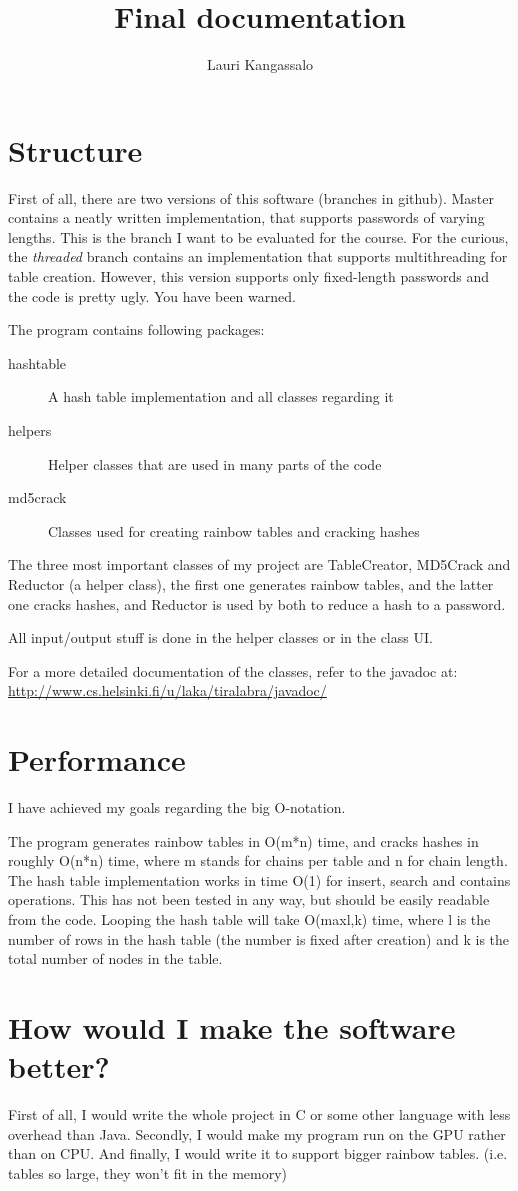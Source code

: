 \documentclass[a4paper, 11pt, finnish]{article}
\title{Final documentation}
\author{Lauri Kangassalo}
\begin{document}
  \maketitle
\section*{Structure}
First of all, there are two versions of this software (branches in github). Master contains a neatly written implementation, that supports passwords of varying lengths. This is the branch I want to be evaluated for the course. For the curious, the \emph{threaded} branch contains an implementation that supports multithreading for table creation. However, this version supports only fixed-length passwords and the code is pretty ugly. You have been warned.

The program contains following packages:
\begin{description}
\item[hashtable] A hash table implementation and all classes regarding it
\item[helpers] Helper classes that are used in many parts of the code
\item[md5crack] Classes used for creating rainbow tables and cracking hashes
\end{description}

The three most important classes of my project are TableCreator, MD5Crack and Reductor (a helper class), the first one generates rainbow tables, and the latter one cracks hashes, and Reductor is used by both to reduce a hash to a password.

All input/output stuff is done in the helper classes or in the class UI.

For a more detailed documentation of the classes, refer to the javadoc at: \url{http://www.cs.helsinki.fi/u/laka/tiralabra/javadoc/}

\section*{Performance}
I have achieved my goals regarding the big O-notation.

The program generates rainbow tables in O(m*n) time, and cracks hashes in roughly O(n*n) time, where m stands for chains per table and n for chain length. The hash table implementation works in time O(1) for insert, search and contains operations. This has not been tested in any way, but should be easily readable from the code. Looping the hash table will take O(max{l,k}) time, where l is the number of rows in the hash table (the number is fixed after creation) and k is the total number of nodes in the table.

\section*{How would I make the software better?}
First of all, I would write the whole project in C or some other language with less overhead than Java. Secondly, I would make my program run on the GPU rather than on CPU. And finally, I would write it to support bigger rainbow tables. (i.e. tables so large, they won't fit in the memory)
\end{document}
